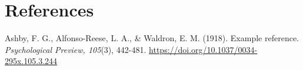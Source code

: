 \documentclass[twocolumn]{article}
\begin{document}
\section*{References}

\begin{hangparas}{1em}{1}

Ashby, F. G., Alfonso-Reese, L. A., \& Waldron, E. M. (1918). Example reference.
\emph{Psychological Preview, 105}(3), 442-481.
\url{https://doi.org/10.1037/0034-295x.105.3.244}

\end{hangparas}
\end{document}
